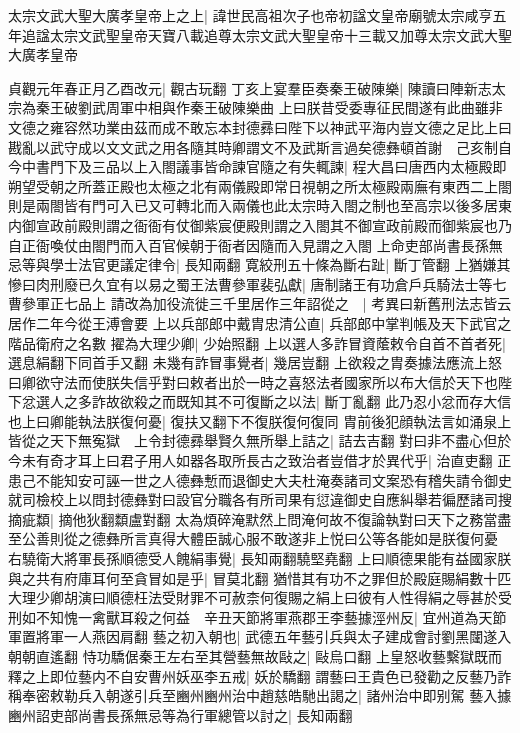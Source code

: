 太宗文武大聖大廣孝皇帝上之上|{
	諱世民高祖次子也帝初諡文皇帝廟號太宗咸亨五年追諡太宗文武聖皇帝天寶八載追尊太宗文武大聖皇帝十三載又加尊太宗文武大聖大廣孝皇帝}


貞觀元年春正月乙酉改元|{
	觀古玩翻}
丁亥上宴羣臣奏秦王破陳樂|{
	陳讀曰陣新志太宗為秦王破劉武周軍中相與作秦王破陳樂曲}
上曰朕昔受委專征民間遂有此曲雖非文德之雍容然功業由茲而成不敢忘本封德彞曰陛下以神武平海内豈文德之足比上曰戡亂以武守成以文文武之用各隨其時卿謂文不及武斯言過矣德彝頓首謝　己亥制自今中書門下及三品以上入閤議事皆命諫官隨之有失輒諫|{
	程大昌曰唐西内太極殿即朔望受朝之所蓋正殿也太極之北有兩儀殿即常日視朝之所太極殿兩廡有東西二上閤則是兩閤皆有門可入已又可轉北而入兩儀也此太宗時入閤之制也至高宗以後多居東内御宣政前殿則謂之衙衙有仗御紫宸便殿則謂之入閤其不御宣政前殿而御紫宸也乃自正衙喚仗由閤門而入百官候朝于衙者因隨而入見謂之入閤}
上命吏部尚書長孫無忌等與學士法官更議定律令|{
	長知兩翻}
寛絞刑五十條為斷右趾|{
	斷丁管翻}
上猶嫌其慘曰肉刑廢已久宜有以易之蜀王法曹參軍裴弘獻|{
	唐制諸王有功倉戶兵騎法士等七曹參軍正七品上}
請改為加役流徙三千里居作三年詔從之　|{
	考異曰新舊刑法志皆云居作二年今從王溥會要}
上以兵部郎中戴胄忠清公直|{
	兵部郎中掌判帳及天下武官之階品衛府之名數}
擢為大理少卿|{
	少始照翻}
上以選人多詐冒資䕃敕令自首不首者死|{
	選息絹翻下同首手又翻}
未幾有詐冒事覺者|{
	幾居豈翻}
上欲殺之胄奏據法應流上怒曰卿欲守法而使朕失信乎對曰敕者出於一時之喜怒法者國家所以布大信於天下也陛下忿選人之多詐故欲殺之而既知其不可復斷之以法|{
	斷丁亂翻}
此乃忍小忿而存大信也上曰卿能執法朕復何憂|{
	復扶又翻下不復朕復何復同}
胄前後犯顔執法言如涌泉上皆從之天下無寃獄　上令封德彞舉賢久無所舉上詰之|{
	詰去吉翻}
對曰非不盡心但於今未有奇才耳上曰君子用人如器各取所長古之致治者豈借才於異代乎|{
	治直吏翻}
正患己不能知安可誣一世之人德彝慙而退御史大夫杜淹奏諸司文案恐有稽失請令御史就司檢校上以問封德彝對曰設官分職各有所司果有愆違御史自應糾舉若徧歷諸司搜摘疵纇|{
	摘他狄翻纇盧對翻}
太為煩碎淹默然上問淹何故不復論執對曰天下之務當盡至公善則從之德彝所言真得大體臣誠心服不敢遂非上悦曰公等各能如是朕復何憂　右驍衛大將軍長孫順德受人餽絹事覺|{
	長知兩翻驍堅堯翻}
上曰順德果能有益國家朕與之共有府庫耳何至貪冒如是乎|{
	冒莫北翻}
猶惜其有功不之罪但於殿庭賜絹數十匹大理少卿胡演曰順德枉法受財罪不可赦柰何復賜之絹上曰彼有人性得絹之辱甚於受刑如不知愧一禽獸耳殺之何益　辛丑天節將軍燕郡王李藝據涇州反|{
	宜州道為天節軍置將軍一人燕因肩翻}
藝之初入朝也|{
	武德五年藝引兵與太子建成會討劉黑闥遂入朝朝直遙翻}
恃功驕倨秦王左右至其營藝無故敺之|{
	敺烏口翻}
上皇怒收藝繫獄既而釋之上即位藝内不自安曹州妖巫李五戒|{
	妖於驕翻}
謂藝曰王貴色已發勸之反藝乃詐稱奉密敕勒兵入朝遂引兵至豳州豳州治中趙慈皓馳出謁之|{
	諸州治中即别駕}
藝入據豳州詔吏部尚書長孫無忌等為行軍總管以討之|{
	長知兩翻}
